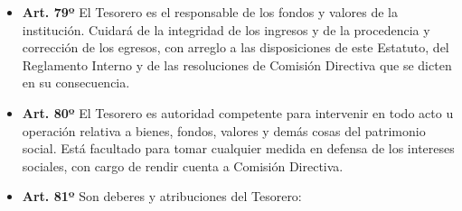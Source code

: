 \documentclass[]{book}
\begin{document}
\begin{itemize}
\item
  \textbf{Art. 79º} El Tesorero es el responsable de los fondos y
  valores de la institución. Cuidará de la integridad de los ingresos y
  de la procedencia y corrección de los egresos, con arreglo a las
  disposiciones de este Estatuto, del Reglamento Interno y de las
  resoluciones de Comisión Directiva que se dicten en su consecuencia.
\item
  \textbf{Art. 80º} El Tesorero es autoridad competente para intervenir
  en todo acto u operación relativa a bienes, fondos, valores y demás
  cosas del patrimonio social. Está facultado para tomar cualquier
  medida en defensa de los intereses sociales, con cargo de rendir
  cuenta a Comisión Directiva.
\item
  \textbf{Art. 81º} Son deberes y atribuciones del Tesorero:


\end{itemize}
\end{document}
